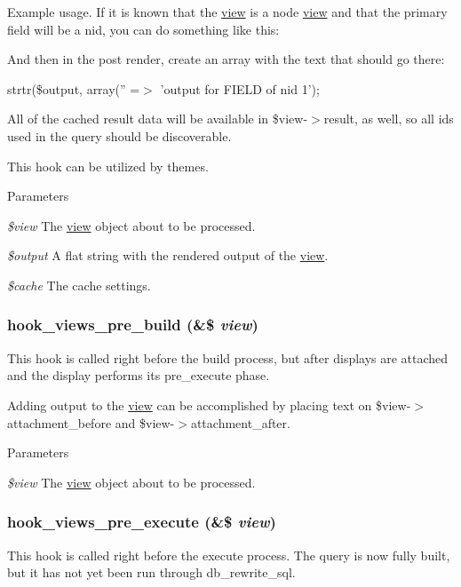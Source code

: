 Example usage. If it is known that the \hyperlink{classview}{view} is a node \hyperlink{classview}{view} and that the primary field will be a nid, you can do something like this:

And then in the post render, create an array with the text that should go there:

strtr(\$output, array('' =$>$ 'output for FIELD of nid 1');

All of the cached result data will be available in \$view-\/$>$result, as well, so all ids used in the query should be discoverable.

This hook can be utilized by themes. 
\begin{DoxyParams}{Parameters}
\item[{\em \$view}]The \hyperlink{classview}{view} object about to be processed. \item[{\em \$output}]A flat string with the rendered output of the \hyperlink{classview}{view}. \item[{\em \$cache}]The cache settings. \end{DoxyParams}
\hypertarget{group__views__hooks_ga1c3fc52e2854310f84eeb43b98a0ba64}{
\subsubsection[{hook\_\-views\_\-pre\_\-build}]{\setlength{\rightskip}{0pt plus 5cm}hook\_\-views\_\-pre\_\-build (\&\$ {\em view})}}
\label{group__views__hooks_ga1c3fc52e2854310f84eeb43b98a0ba64}
This hook is called right before the build process, but after displays are attached and the display performs its pre\_\-execute phase.

Adding output to the \hyperlink{classview}{view} can be accomplished by placing text on \$view-\/$>$attachment\_\-before and \$view-\/$>$attachment\_\-after. 
\begin{DoxyParams}{Parameters}
\item[{\em \$view}]The \hyperlink{classview}{view} object about to be processed. \end{DoxyParams}
\hypertarget{group__views__hooks_gaf7582b210bdd367d6006c7dc62304475}{
\subsubsection[{hook\_\-views\_\-pre\_\-execute}]{\setlength{\rightskip}{0pt plus 5cm}hook\_\-views\_\-pre\_\-execute (\&\$ {\em view})}}
\label{group__views__hooks_gaf7582b210bdd367d6006c7dc62304475}
This hook is called right before the execute process. The query is now fully built, but it has not yet been run through db\_\-rewrite\_\-sql.

